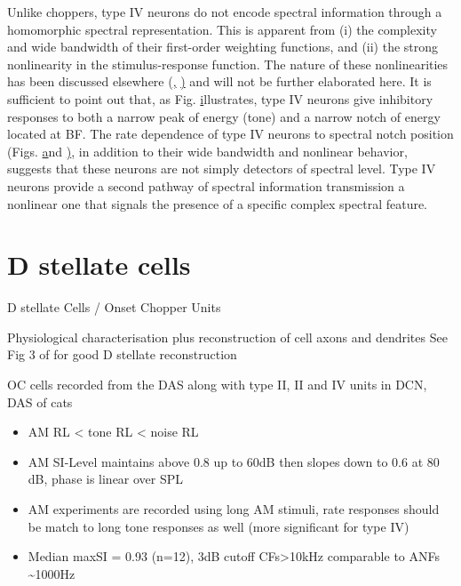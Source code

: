 \documentclass[10pt,a4paper]{article}
\begin{document}
Unlike choppers, type IV neurons do not encode spectral information through a
homomorphic spectral representation. This is apparent from (i) the complexity
and wide bandwidth of their first-order weighting functions, and (ii) the strong
nonlinearity in the stimulus-response function. The nature of these
nonlinearities has been discussed elsewhere
(\href{www.pnas.org/cgi/content/full/97/22/11780#B24},
\href{www.pnas.org/cgi/content/full/97/22/11780#B29})
and will not be further elaborated here. It is sufficient to point out that, as
Fig.
\href{www.pnas.org/cgi/content/full/97/22/11780#F3}
illustrates, type IV neurons give inhibitory responses to both a narrow peak of
energy (tone) and a narrow notch of energy located at BF. The rate dependence of
type IV neurons to spectral notch position (Figs.
\href{www.pnas.org/cgi/content/full/97/22/11780#F3}
and
\href{www.pnas.org/cgi/content/full/97/22/11780#F6}),
in addition to their wide bandwidth and nonlinear behavior, suggests that these
neurons are not simply detectors of spectral level. Type IV neurons provide a
second pathway of spectral information transmission
a nonlinear one that signals the presence of a specific complex spectral
feature.


\section{D stellate cells} 

{D  stellate Cells / Onset Chopper Units}
 
\citep{PalmerJiangEtAl:1996,PalmerWallaceEtAl:2003,PalmerWinter:1996,PaoliniClareyEtAl:2005,PaoliniClareyEtAl:2004,PaoliniClark:1999,PaoliniClarkEtAl:1997,PaoliniCotterillEtAl:1998,PaoliniCotterillEtAl:1998a}


Physiological characterisation plus reconstruction of cell axons and dendrites
 \citep{ArnottWallaceEtAl:2004} See Fig 3 of \citep{DoucetRyugo:1997} for good D
 stellate reconstruction

\citep{JorisSmith:1998} OC cells recorded from the DAS along with type II, II
and IV units in DCN, DAS of cats


\begin{itemize}
\item AM RL {\textless} tone RL {\textless} noise RL
\item AM SI-Level maintains above 0.8 up to 60dB then slopes down to 0.6 at 80
  dB, phase is linear over SPL
\item AM experiments are recorded using long AM stimuli, rate responses should
  be match to long tone responses as well (more significant for type IV)
\item Median maxSI = 0.93 (n=12), 3dB cutoff CFs{\textgreater}10kHz comparable
  to ANFs \~{}1000Hz
\end{itemize}
\end{document}
